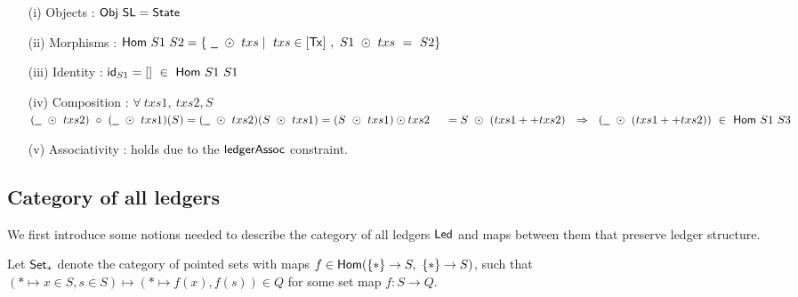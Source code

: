 \begin{itemize}
  \item[(i)] Objects : $\mathsf{Obj}~\mathsf{SL} = \mathsf{State}$ \newline

  \item[(ii)] Morphisms : $\fun{Hom}~S1~S2 = \{ ~\wcard~\odot~txs \mid ~txs \in [\Tx]~,~S1~ \odot~txs~=~S2 \}$ \newline

  \item[(iii)] Identity : $\mathsf{id}_{S1} = [] ~\in~\mathsf{Hom}~S1~S1 $ \newline

  \item[(iv)] Composition : $\forall~txs1,~txs2, S$ \\
  $(\wcard~\odot~txs2) ~\circ~(\wcard~\odot~txs1) (S) = (\wcard~\odot~txs2) (S~\odot~txs1) = (S~\odot~txs1) \odot txs2  \\
  ~~~~ =  S~\odot~(txs1 ++ txs2)~~\Rightarrow ~~(\wcard~\odot~(txs1 ++ txs2))~\in ~\fun{Hom}~S1~S3$

  \item[(v)] Associativity : holds due to the $\mathsf{ledgerAssoc}$ constraint.

\end{itemize}


\subsection{Category of all ledgers}
\label{sec:all-ledgers}

We first introduce some notions needed to describe the category of all ledgers $\mathsf{Led}$
and maps between them that preserve ledger structure.

Let $\mathsf{Set}_{*}$ denote the category of pointed sets with maps $f \in \mathsf{Hom} (\{*\} \to S,~\{*\} \to S)$,
such that $({*} \mapsto x \in S, s \in S) \mapsto (* \mapsto f(x), f(s)) \in Q$ for some
set map $f : S \to Q$.

